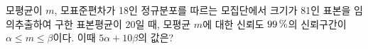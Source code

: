 모평균이 $m$, 모표준편차가 18인 정규분포를 따르는 모집단에서 크기가 81인 표본을 임의추출하여 구한 표본평균이 20일 때, 모평균 $m$에 대한 신뢰도 $99\mkern3mu \%$의 신뢰구간이 $\alpha\le m\le\beta$이다. 이때 $5\alpha+10\beta$의 값은? 
